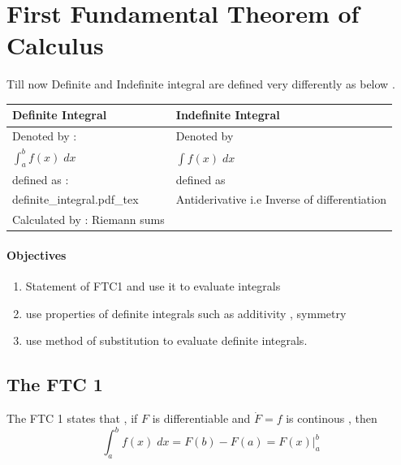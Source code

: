 \section{First Fundamental Theorem of Calculus}

Till now Definite and Indefinite integral are defined
very differently as below . 

\begin{tabular}{l|l}
	\toprule
	Definite Integral &           Indefinite Integral\\
	\midrule
	Denoted by :      &                    Denoted by \\
	$\int^{b}_{a} f(x) \; dx$  & $\int f(x) \; dx$  \\

	defined as :      &                 defined as \\

	{definite_integral.pdf_tex}
						      &	Antiderivative i.e Inverse of differentiation    \\

	Calculated by : 
	Riemann sums      &                            \\
\end{tabular}

\paragraph{Objectives} 

\begin{enumerate}

    \item Statement of FTC1 and use it to evaluate integrals 
    \item  use properties of definite integrals such as additivity , symmetry
    \item use method of substitution to evaluate definite integrals. 

\end{enumerate}

\subsection{ The FTC 1 } 

\begin{definition*}
    The FTC 1 states that , if $F$ is differentiable and $\dot F = f$ is continous , then 
    \begin{equation*}
        \int^{b}_{a} f(x) \; dx = F(b) - F(a) = F(x) \Biggr |_{a}^{b} 
    \end{equation*}
\end{definition*}

